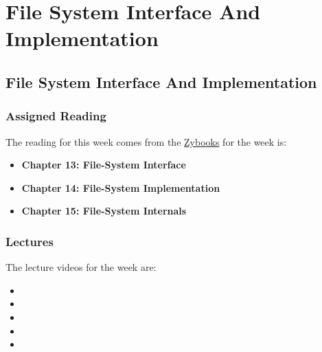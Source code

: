 \clearpage

\renewcommand{\ChapTitle}{File System Interface And Implementation}
\renewcommand{\SectionTitle}{File System Interface And Implementation}

\chapter{\ChapTitle}
\section{\SectionTitle}

\subsection{Assigned Reading}

The reading for this week comes from the \href{https://learn.zybooks.com/zybook/COLORADOCSPB3753KnoxFall2024}{Zybooks} for the week is:

\begin{itemize}
    \item \textbf{Chapter 13: File-System Interface}
    \item \textbf{Chapter 14: File-System Implementation}
    \item \textbf{Chapter 15: File-System Internals}
\end{itemize}

\subsection{Lectures}

The lecture videos for the week are:

\begin{itemize}
    \item {}
    \item {}
    \item {}
    \item {}
    \item {}
\end{itemize}

